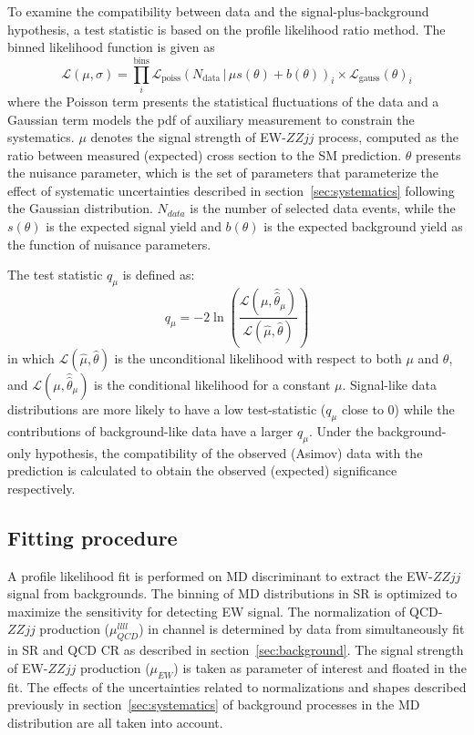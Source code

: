 To examine the compatibility between data and the signal-plus-background hypothesis, 
a test statistic is based on the profile likelihood ratio method.
The binned likelihood function is given as
\begin{equation}
	\mathcal{L}(\mu,\sigma) = \prod_{i}^\mathrm{bins} \mathcal{L}_{\mathrm{poiss}}(N_{\mathrm{data}}\,|\,\mu s(\theta)+b(\theta))_{i} \times \mathcal{L}_{\text{gauss}}(\theta)_{i}
\end{equation}
where the Poisson term presents the statistical fluctuations of the data 
and a Gaussian term models the pdf of auxiliary measurement to constrain the systematics.
$\mu$ denotes the signal strength of EW-$ZZjj$ process, computed as the ratio between measured (expected) cross section to the SM prediction.
$\theta$ presents the nuisance parameter, which is the set of parameters that parameterize the effect of systematic uncertainties described in section~\ref{sec:systematics} following the Gaussian distribution.
$N_{data}$ is the number of selected data events, while the $s(\theta)$ is the expected signal yield and $b(\theta)$ is the expected background yield as the function of nuisance parameters.

The test statistic $q_{\mu}$ is defined as:
\begin{equation}
	q_\mu = -2 \ln \left( \dfrac{\mathcal{L}(\mu,\hat{\hat{\theta}}_{\mu})}{\mathcal{L}(\hat{\mu},\hat{\theta})} \right)
\end{equation}
in which $\mathcal{L}(\hat{\mu},\hat{\theta})$ is the unconditional likelihood with respect to both $\mu$ and $\theta$,
and $\mathcal{L}(\mu,\hat{\hat{\theta}}_{\mu})$ is the conditional likelihood for a constant $\mu$.
Signal-like data distributions are more likely to have a low test-statistic ($q_\mu$ close to 0) 
while the contributions of background-like data have a larger $q_\mu$.
Under the background-only hypothesis, the compatibility of the observed (Asimov) data with the prediction 
is calculated to obtain the observed (expected) significance respectively.
\fi

\subsection{Fitting procedure}

A profile likelihood fit is performed on MD discriminant to extract the EW-$ZZjj$ signal from backgrounds.
The binning of MD distributions in SR is optimized to maximize the sensitivity for detecting EW signal.
The normalization of QCD-$ZZjj$ production ($\mu_{QCD}^{llll}$) in \llll channel is determined by data from simultaneously fit in SR and QCD CR as described in section~\ref{sec:background}.
The signal strength of EW-$ZZjj$ production ($\mu_{EW}$) is taken as parameter of interest and floated in the fit.
The effects of the uncertainties related to normalizations and shapes described previously in section~\ref{sec:systematics} 
of background processes in the MD distribution are all taken into account.

